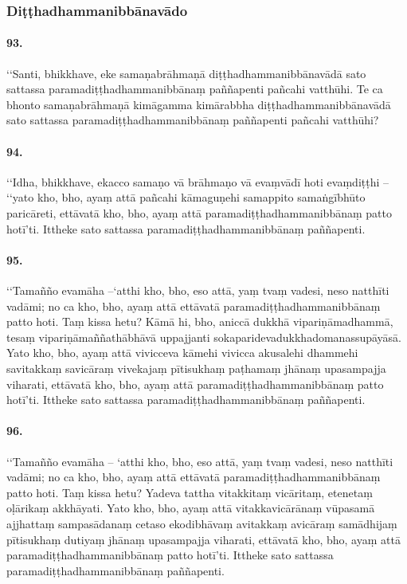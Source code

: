 \subsubsection{Diṭṭhadhammanibbānavādo}

\paragraph{93.}
‘‘Santi, bhikkhave, eke samaṇabrāhmaṇā diṭṭhadhammanibbānavādā sato sattassa paramadiṭṭhadhammanibbānaṃ paññapenti pañcahi vatthūhi. Te ca bhonto samaṇabrāhmaṇā kimāgamma kimārabbha diṭṭhadhammanibbānavādā sato sattassa paramadiṭṭhadhammanibbānaṃ paññapenti pañcahi vatthūhi?

\paragraph{94.}
‘‘Idha, bhikkhave, ekacco samaṇo vā brāhmaṇo vā evaṃvādī hoti evaṃdiṭṭhi – ‘‘yato kho, bho, ayaṃ attā pañcahi kāmaguṇehi samappito samaṅgībhūto paricāreti, ettāvatā kho, bho, ayaṃ attā paramadiṭṭhadhammanibbānaṃ patto hotī’ti. Ittheke sato sattassa paramadiṭṭhadhammanibbānaṃ paññapenti.

\paragraph{95.}
‘‘Tamañño evamāha –‘atthi kho, bho, eso attā, yaṃ tvaṃ vadesi, neso natthīti vadāmi; no ca kho, bho, ayaṃ attā ettāvatā paramadiṭṭhadhammanibbānaṃ patto hoti. Taṃ kissa hetu? Kāmā hi, bho, aniccā dukkhā vipariṇāmadhammā, tesaṃ vipariṇāmaññathābhāvā uppajjanti sokaparidevadukkhadomanassupāyāsā. Yato kho, bho, ayaṃ attā vivicceva kāmehi vivicca akusalehi dhammehi savitakkaṃ savicāraṃ vivekajaṃ pītisukhaṃ paṭhamaṃ jhānaṃ upasampajja viharati, ettāvatā kho, bho, ayaṃ attā paramadiṭṭhadhammanibbānaṃ patto hotī’ti. Ittheke sato sattassa paramadiṭṭhadhammanibbānaṃ paññapenti.

\paragraph{96.}
‘‘Tamañño evamāha – ‘atthi kho, bho, eso attā, yaṃ tvaṃ vadesi, neso natthīti vadāmi; no ca kho, bho, ayaṃ attā ettāvatā paramadiṭṭhadhammanibbānaṃ patto hoti. Taṃ kissa hetu? Yadeva tattha vitakkitaṃ vicāritaṃ, etenetaṃ oḷārikaṃ akkhāyati. Yato kho, bho, ayaṃ attā vitakkavicārānaṃ vūpasamā ajjhattaṃ sampasādanaṃ cetaso ekodibhāvaṃ avitakkaṃ avicāraṃ samādhijaṃ pītisukhaṃ dutiyaṃ jhānaṃ upasampajja viharati, ettāvatā kho, bho, ayaṃ attā paramadiṭṭhadhammanibbānaṃ patto hotī’ti. Ittheke sato sattassa paramadiṭṭhadhammanibbānaṃ paññapenti.

